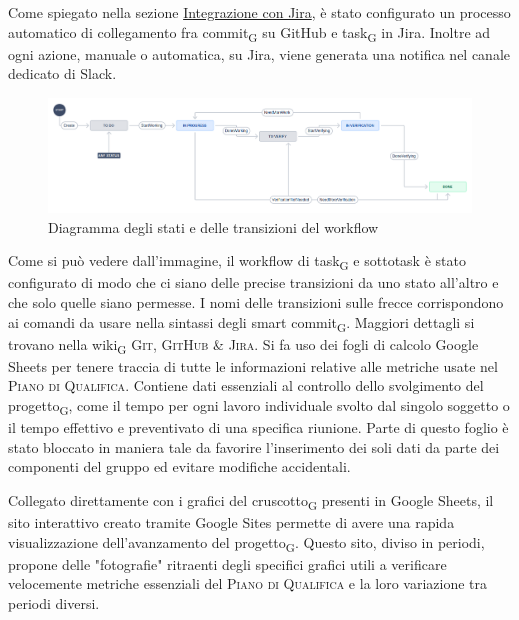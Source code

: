         Come spiegato nella sezione \hyperref[jiraintegration]{Integrazione con Jira}, è stato configurato un processo automatico di collegamento fra commit\textsubscript{G} su GitHub e task\textsubscript{G} in Jira. Inoltre ad ogni azione, manuale o automatica, su Jira, viene generata una notifica nel canale dedicato di Slack.
        \begin{figure}[H]
            \centering
            \includegraphics[scale=0.32]{res/images/jira_workflow.png}
            \caption{Diagramma degli stati e delle transizioni del workflow}
        \end{figure}
            Come si può vedere dall'immagine, il workflow di task\textsubscript{G} e sottotask è stato configurato di modo che ci siano delle precise transizioni da uno stato all'altro e che solo quelle siano permesse. I nomi delle transizioni sulle frecce corrispondono ai comandi da usare nella sintassi degli smart commit\textsubscript{G}. Maggiori dettagli si trovano nella wiki\textsubscript{G} \textsc{Git, GitHub \& Jira}.
        Si fa uso dei fogli di calcolo Google Sheets per tenere traccia di tutte le informazioni relative alle metriche usate nel \textsc{Piano di Qualifica}. Contiene dati essenziali al controllo dello svolgimento del progetto\textsubscript{G}, come il tempo per ogni lavoro individuale svolto dal singolo soggetto o il tempo effettivo e preventivato di una specifica riunione. Parte di questo foglio è stato bloccato in maniera tale da favorire l'inserimento dei soli dati da parte dei componenti del gruppo ed evitare modifiche accidentali.

        Collegato direttamente con i grafici del cruscotto\textsubscript{G} presenti in Google Sheets, il sito interattivo creato tramite Google Sites permette di avere una rapida visualizzazione dell'avanzamento del progetto\textsubscript{G}. Questo sito, diviso in periodi, propone delle "fotografie" ritraenti degli specifici grafici utili a verificare velocemente metriche essenziali del \textsc{Piano di Qualifica} e la loro variazione tra periodi diversi.


